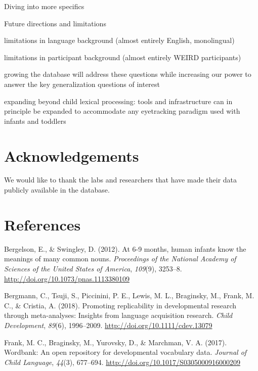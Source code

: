 \documentclass[10pt, letterpaper]{article}
\begin{document}
Diving into more specifics

Future directions and limitations

limitations in language background (almost entirely English,
monolingual)

limitations in participant background (almost entirely WEIRD
participants)

growing the database will address these questions while increasing our
power to answer the key generalization questions of interest

expanding beyond child lexical processing: tools and infrastructure can
in principle be expanded to accommodate any eyetracking paradigm used
with infants and toddlers

\hypertarget{acknowledgements}{%
\section{Acknowledgements}\label{acknowledgements}}

We would like to thank the labs and researchers that have made their
data publicly available in the database.

\hypertarget{references}{%
\section{References}\label{references}}

\setlength{\parindent}{-0.1in} 
\setlength{\leftskip}{0.125in}

\noindent

\hypertarget{refs}{}
\leavevmode\hypertarget{ref-Bergelson2012a}{}%
Bergelson, E., \& Swingley, D. (2012). At 6-9 months, human infants know
the meanings of many common nouns. \emph{Proceedings of the National
Academy of Sciences of the United States of America}, \emph{109}(9),
3253--8. \url{http://doi.org/10.1073/pnas.1113380109}

\leavevmode\hypertarget{ref-Bergmann2018}{}%
Bergmann, C., Tsuji, S., Piccinini, P. E., Lewis, M. L., Braginsky, M.,
Frank, M. C., \& Cristia, A. (2018). Promoting replicability in
developmental research through meta-analyses: Insights from language
acquisition research. \emph{Child Development}, \emph{89}(6),
1996--2009. \url{http://doi.org/10.1111/cdev.13079}

\leavevmode\hypertarget{ref-Frank2016}{}%
Frank, M. C., Braginsky, M., Yurovsky, D., \& Marchman, V. A. (2017).
Wordbank: An open repository for developmental vocabulary data.
\emph{Journal of Child Language}, \emph{44}(3), 677--694.
\url{http://doi.org/10.1017/S0305000916000209}
\end{document}
